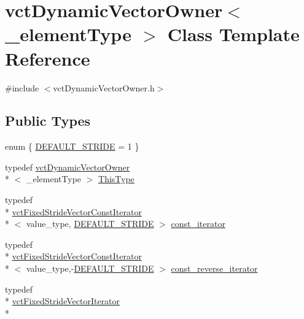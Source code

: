 \hypertarget{classvct_dynamic_vector_owner}{\section{vct\-Dynamic\-Vector\-Owner$<$ \-\_\-element\-Type $>$ Class Template Reference}
\label{classvct_dynamic_vector_owner}
}


{\ttfamily \#include $<$vct\-Dynamic\-Vector\-Owner.\-h$>$}

\subsection*{Public Types}
\begin{DoxyCompactItemize}
\item 
enum \{ \hyperlink{classvct_dynamic_vector_owner_aa8a4c610d62931e2fa3374a05e4ae56ca4925b2613604288a5936bd34e22b6a9f}{D\-E\-F\-A\-U\-L\-T\-\_\-\-S\-T\-R\-I\-D\-E} = 1
 \}
\item 
typedef \hyperlink{classvct_dynamic_vector_owner}{vct\-Dynamic\-Vector\-Owner}\\*
$<$ \-\_\-element\-Type $>$ \hyperlink{classvct_dynamic_vector_owner_ad27e45098d2fe34a4650fca580526b18}{This\-Type}
\item 
typedef \\*
\hyperlink{classvct_fixed_stride_vector_const_iterator}{vct\-Fixed\-Stride\-Vector\-Const\-Iterator}\\*
$<$ value\-\_\-type, \hyperlink{classvct_dynamic_vector_owner_aa8a4c610d62931e2fa3374a05e4ae56ca4925b2613604288a5936bd34e22b6a9f}{D\-E\-F\-A\-U\-L\-T\-\_\-\-S\-T\-R\-I\-D\-E} $>$ \hyperlink{classvct_dynamic_vector_owner_a607608d191422c1d82168ffecd37c853}{const\-\_\-iterator}
\item 
typedef \\*
\hyperlink{classvct_fixed_stride_vector_const_iterator}{vct\-Fixed\-Stride\-Vector\-Const\-Iterator}\\*
$<$ value\-\_\-type,-\/\hyperlink{classvct_dynamic_vector_owner_aa8a4c610d62931e2fa3374a05e4ae56ca4925b2613604288a5936bd34e22b6a9f}{D\-E\-F\-A\-U\-L\-T\-\_\-\-S\-T\-R\-I\-D\-E} $>$ \hyperlink{classvct_dynamic_vector_owner_ab157dd93c9061bb74e4a5983606e200a}{const\-\_\-reverse\-\_\-iterator}
\item 
typedef \\*
\hyperlink{classvct_fixed_stride_vector_iterator}{vct\-Fixed\-Stride\-Vector\-Iterator}\\*

\end{DoxyCompactItemize}
